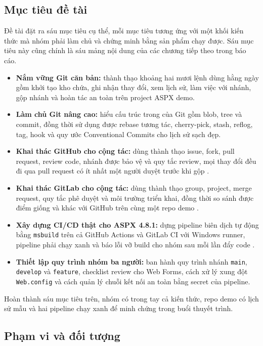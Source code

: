\subsection{Mục tiêu đề tài}

Đề tài đặt ra sáu mục tiêu cụ thể, mỗi mục tiêu tương ứng với một khối kiến thức mà nhóm phải làm chủ và chứng minh bằng sản phẩm chạy được.
Sáu mục tiêu này cũng chính là sáu mảng nội dung của các chương tiếp theo trong báo cáo.
\begin{itemize}
\item \textbf{Nắm vững Git căn bản:} thành thạo khoảng hai mươi lệnh dùng hằng ngày gồm khởi tạo kho chứa, ghi nhận thay đổi, xem lịch sử, làm việc với nhánh, gộp nhánh và hoàn tác an toàn trên project ASPX demo.
\item \textbf{Làm chủ Git nâng cao:} hiểu cấu trúc trong của Git gồm blob, tree và commit, đồng thời sử dụng được rebase tương tác, cherry-pick, stash, reflog, tag, hook và quy ước Conventional Commits cho lịch sử sạch đẹp.
\item \textbf{Khai thác GitHub cho cộng tác:} dùng thành thạo issue, fork, pull request, review code, nhánh được bảo vệ và quy tắc review, mọi thay đổi đều đi qua pull request có ít nhất một người duyệt trước khi gộp \cite{githubdocs}.
\item \textbf{Khai thác GitLab cho cộng tác:} dùng thành thạo group, project, merge request, quy tắc phê duyệt và môi trường triển khai, đồng thời so sánh được điểm giống và khác với GitHub trên cùng một repo demo \cite{gitlabdocs}.
\item \textbf{Xây dựng CI/CD thật cho ASPX 4.8.1:} dựng pipeline biên dịch tự động bằng \verb|msbuild| trên cả GitHub Actions và GitLab CI với Windows runner, pipeline phải chạy xanh và báo lỗi vỡ build cho nhóm sau mỗi lần đẩy code \cite{ghactions, gitlabci}.
\item \textbf{Thiết lập quy trình nhóm ba người:} ban hành quy trình nhánh \verb|main|, \verb|develop| và \verb|feature|, checklist review cho Web Forms, cách xử lý xung đột \texttt{Web.config} và cách quản lý chuỗi kết nối an toàn bằng secret của pipeline.
\end{itemize}
Hoàn thành sáu mục tiêu trên, nhóm có trong tay cả kiến thức, repo demo có lịch sử mẫu và hai pipeline chạy xanh để minh chứng trong buổi thuyết trình.

\subsection{Phạm vi và đối tượng}

